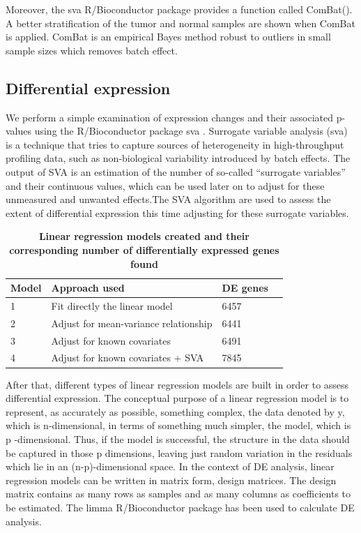 \documentclass[9pt,twocolumn,twoside]{gsajnl}
\begin{document}
Moreover, the sva \citep{sva} R/Bioconductor package provides a function called ComBat(). A better stratification of the tumor and normal samples are shown when ComBat is applied. ComBat is an empirical Bayes method robust to outliers in small sample sizes which removes batch effect. 


\subsection*{Differential expression}

We perform a simple examination of expression changes and their associated p-values using the R/Bioconductor package sva \citep{sva}. Surrogate variable analysis (sva) is a technique that tries to capture sources of heterogeneity in high-throughput profiling data, such as non-biological variability introduced by batch effects. The output of SVA is an estimation of the number of so-called “surrogate variables” and their continuous values, which can be used later on to adjust for these unmeasured and unwanted effects.The SVA algorithm are used to assess the extent of differential expression this time adjusting for these surrogate variables.  

\begin{table}[htbp]
\begin{center}
\caption{\bf Linear regression models created and their corresponding number of differentially expressed genes found}
\begin{tableminipage}{\textwidth}
\begin{tabularx}{\textwidth}{XXXX}
\hline
Model & Approach used & DE genes \\ [0.5ex]
\hline
1 & Fit directly the linear model & 6457 \\
2 & Adjust for mean-variance relationship & 6441 \\
3 & Adjust for known covariates & 6491 \\
4 & Adjust for known covariates + SVA & 7845 \\
\hline
\end{tabularx}
  \label{tab:shape-functions}
\end{tableminipage}
\end{center}
\end{table}

After that, different types of linear regression models are built in order to assess differential expression. The conceptual purpose of a linear regression model is to represent, as accurately as possible, something complex, the data denoted by y, which is n-dimensional, in terms of something much simpler, the model, which is p -dimensional. Thus, if the model is successful, the structure in the data should be captured in those p dimensions, leaving just random variation in the residuals which lie in an (n-p)-dimensional space. In the context of DE analysis, linear regression models can be written in matrix form, design matrices. The design matrix contains as many rows as samples and as many columns as coefficients to be estimated. The limma \citep{Ritchie2015} R/Bioconductor package has been used to calculate DE analysis.
\end{document}
